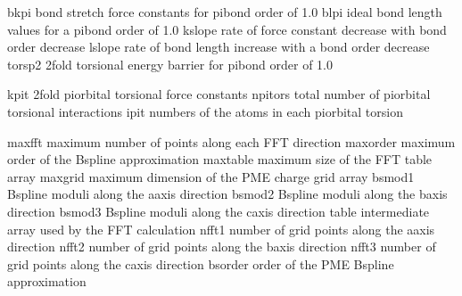 \documentclass[letterpaper,11pt,english]{sphinxmanual}
\begin{document}

\begin{sphinxVerbatim}[commandchars=\\\{\}]
bkpi            bond stretch force constants for pi\PYGZhy{}bond order of 1.0
blpi            ideal bond length values for a pi\PYGZhy{}bond order of 1.0
kslope          rate of force constant decrease with bond order decrease
lslope          rate of bond length increase with a bond order decrease
torsp2          2\PYGZhy{}fold torsional energy barrier for pi\PYGZhy{}bond order of 1.0
\end{sphinxVerbatim}


\begin{sphinxVerbatim}[commandchars=\\\{\}]
kpit            2\PYGZhy{}fold pi\PYGZhy{}orbital torsional force constants
npitors         total number of pi\PYGZhy{}orbital torsional interactions
ipit            numbers of the atoms in each pi\PYGZhy{}orbital torsion
\end{sphinxVerbatim}


\begin{sphinxVerbatim}[commandchars=\\\{\}]
maxfft          maximum number of points along each FFT direction
maxorder        maximum order of the B\PYGZhy{}spline approximation
maxtable        maximum size of the FFT table array
maxgrid         maximum dimension of the PME charge grid array
bsmod1          B\PYGZhy{}spline moduli along the a\PYGZhy{}axis direction
bsmod2          B\PYGZhy{}spline moduli along the b\PYGZhy{}axis direction
bsmod3          B\PYGZhy{}spline moduli along the c\PYGZhy{}axis direction
table           intermediate array used by the FFT calculation
nfft1           number of grid points along the a\PYGZhy{}axis direction
nfft2           number of grid points along the b\PYGZhy{}axis direction
nfft3           number of grid points along the c\PYGZhy{}axis direction
bsorder         order of the PME B\PYGZhy{}spline approximation
\end{sphinxVerbatim}

\end{document}
